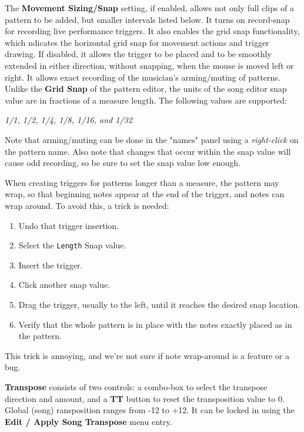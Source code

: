    The \textbf{Movement Sizing/Snap} setting,
   if enabled, allows not only full clips of a pattern to be added,
   but smaller intervals listed below.
   It turns on record-snap for recording live performance triggers.
   It also enables the grid snap functionality,
   which ndicates the horizontal grid snap for movement actions and trigger
   drawing.
   If disabled, it allows the trigger to be placed and to be smoothly extended
   in either direction, without snapping, when the mouse is moved left or
   right. It allows exact recording of the musician's arming/muting of
   patterns.
   Unlike the \textbf{Grid Snap} of the pattern editor, the units
   of the song editor snap value are in fractions of a measure length.
   The following values are supported:

   \textsl{1/1, 1/2, 1/4, 1/8, 1/16, and 1/32}

   Note that arming/muting can be done in the "names" panel using a
   \textsl{right-click} on the pattern name.
   Also note that changes that occur within the snap value will 
   cause odd recording, so be sure to set the snap value low enough.

   When creating triggers for patterns longer than a measure,
   the pattern may wrap, so that beginning notes appear at the end of the
   trigger, and notes can wrap around.
   To avoid this, a trick is needed:

   \begin{enumerate}
      \item Undo that trigger insertion.
      \item Select the \texttt{Length} Snap value.
      \item Insert the trigger.
      \item Click another snap value.
      \item Drag the trigger, usually to the left, until it reaches the
         desired snap location.
      \item Verify that the whole pattern is in place with the notes exactly
         placed as in the pattern.
   \end{enumerate}

   This trick is annoying, and we're not sure if note wrap-around
   is a feature or a bug.

   \textbf{Transpose} consists of two controls:
   a combo-box to select the transpose direction and amount,
   and a \textbf{TT} button to reset the transposition value to 0.
   Global (song) ransposition ranges from -12 to +12.
   It can be locked in using the
   \textbf{Edit / Apply Song Transpose} menu entry.

